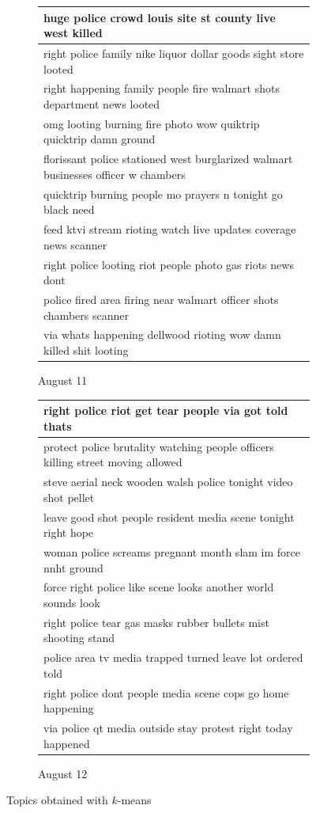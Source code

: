 \documentclass[a4paper,twoside,12pt,openright]{report}
\begin{document}
\begin{figure}[H]
\begin{subfigure}[t]{\textwidth}
  \centering
\begin{tabularx}{0.9\textwidth}{l}
\hline
huge police crowd louis site st county live west killed \\ \hline
right police family nike liquor dollar goods sight store looted \\ \hline
right happening family people fire walmart shots department news looted \\ \hline
omg looting burning fire photo wow quiktrip quicktrip damn ground \\ \hline
florissant police stationed west burglarized walmart businesses officer w chambers \\ \hline
quicktrip burning people mo prayers n tonight go black need \\ \hline
feed ktvi stream rioting watch live updates coverage news scanner \\ \hline
right police looting riot people photo gas riots news dont \\ \hline
police fired area firing near walmart officer shots chambers scanner \\ \hline
via whats happening dellwood rioting wow damn killed shit looting \\ \hline
\end{tabularx}
\caption{August 11}
\label{topicKmeans11}
\end{subfigure}
\begin{subfigure}[t]{\textwidth}
\vspace*{30pt}
  \centering
\begin{tabularx}{0.9\textwidth}{l}
\hline
right police riot get tear people via got told thats \\ \hline
protect police brutality watching people officers killing street moving allowed \\ \hline
steve aerial neck wooden walsh police tonight video shot pellet \\ \hline
leave good shot people resident media scene tonight right hope \\ \hline
woman police screams pregnant month slam im force nnht ground \\ \hline
force right police like scene looks another world sounds look \\ \hline
right police tear gas masks rubber bullets mist shooting stand \\ \hline
police area tv media trapped turned leave lot ordered told \\ \hline
right police dont people media scene cops go home happening \\ \hline
via police qt media outside stay protest right today happened \\ \hline
\end{tabularx}
\caption{August 12}
\label{topicKmeans12}
\end{subfigure}
\caption{Topics obtained with $k$-means}
\end{figure}
\end{document}
